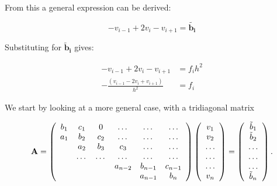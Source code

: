 \documentclass[12pt]{article}
\begin{document}
From this a general expression can be derived:


\begin{equation*}
-v_{i-1} + 2v_{i} - v_{i+1} = \mathbf{\tilde{b_i}} 
\end{equation*}


Substituting for $\mathbf{\tilde{b}_i}$ gives:


\begin{align*}
-v_{i-1} + 2v_{i} - v_{i+1} &= f_ih^2 \\
-\frac{(v_{i-1} - 2v_{i} + v_{i+1})}{h^2} &= f_i 
\end{align*}

\begin{equation*}
\end{equation*}
We start by looking at a more general case, with a tridiagonal  matrix 

\begin{equation}
    {\bf A} = \left(\begin{array}{cccccc}
                           b_1& c_1 & 0 &\dots   & \dots &\dots \\
                           a_1 & b_2 & c_2 &\dots &\dots &\dots \\
                           & a_2 & b_3 & c_3 & \dots & \dots \\
                           & \dots   & \dots &\dots   &\dots & \dots \\
                           &   &  &a_{n-2}  &b_{n-1}& c_{n-1} \\
                           &    &  &   &a_{n-1} & b_n \\
                      \end{array} \right)\left(\begin{array}{c}
                           v_1\\
                           v_2\\
                           \dots \\
                          \dots  \\
                          \dots \\
                           v_n\\
                      \end{array} \right)
  =\left(\begin{array}{c}
                           \tilde{b}_1\\
                           \tilde{b}_2\\
                           \dots \\
                           \dots \\
                          \dots \\
                           \tilde{b}_n\\
                      \end{array} \right).
 \end{equation}            
 
\end{document}
